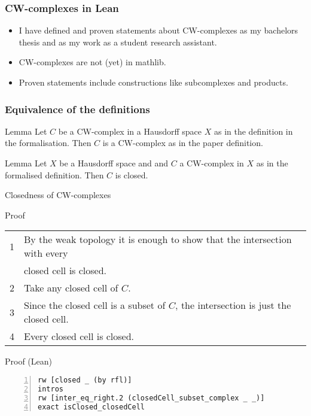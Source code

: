 \documentclass{beamer}
\begin{document}
\begin{frame}
  \frametitle{CW-complexes in Lean}
  \begin{itemize}
    \item I have defined and proven statements about CW-complexes as my bachelors thesis and as my work as a student research assistant.
    \item CW-complexes are not (yet) in mathlib. 
    \item Proven statements include constructions like subcomplexes and products.
  \end{itemize}
\end{frame}

\begin{frame}
\frametitle{Equivalence of the definitions}
\begin{block}{Lemma}
  Let $C$ be a CW-complex in a Hausdorff space $X$ as in the definition in the formalisation.
  Then $C$ is a CW-complex as in the paper definition.
\end{block}
\begin{block}{Lemma}
  Let $X$ be a Hausdorff space and and $C$ a CW-complex in $X$ as in the formalised definition.
  Then $C$ is closed.
\end{block}
\end{frame}

\begin{frame}[fragile]{Closedness of CW-complexes}
  \begin{exampleblock}{Proof}
    \small
    \begin{tabular}{ll}
      1& By the weak topology it is enough to show that the intersection with every \\
      & closed cell is closed.\\
      2& Take any closed cell of $C$.\\
      3& Since the closed cell is a subset of $C$, the intersection is just the closed cell.\\
      4& Every closed cell is closed.\\
    \end{tabular}
  \end{exampleblock}
  \begin{exampleblock}{Proof (Lean)}
\begin{lstlisting}[basicstyle=\ttfamily\small, numbers=left, xleftmargin=21pt]
rw [closed _ (by rfl)]
intros
rw [inter_eq_right.2 (closedCell_subset_complex _ _)]
exact isClosed_closedCell
\end{lstlisting}
  \end{exampleblock}

\end{frame}
\end{document}
